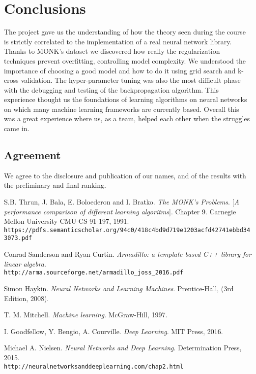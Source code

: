 \section{Conclusions}
The project gave us the understanding of how the theory seen during the course is strictly correlated to the implementation of a real neural network library. Thanks to MONK's dataset we discovered how really the regularization techniques prevent overfitting, controlling model complexity. We understood the importance of choosing a good model and how to do it using grid search and k-cross validation. The hyper-parameter tuning was also the most difficult phase with the debugging and testing of the backpropagation algorithm. This experience thought us the foundations of learning algorithms on neural networks on which many machine learning frameworks are currently based. Overall this was a great experience where us, as a team, helped each other when the struggles came in.
\subsection{Agreement}
We agree to the disclosure and publication of our names, and of the results with the
preliminary and final ranking.


\begin{thebibliography}{9}
	S.B. Thrun, J. Bala, E. Boloederon and I. Bratko.
	\textit{The MONK's Problems}. 
	[\textit{A performance comparison of different learning algoritms}]. Chapter 9.
	Carnegie Mellon University CMU-CS-91-197, 1991.
	\\\texttt{https://pdfs.semanticscholar.org/94c0/418c4bd9d719e1203acfd42741ebbd343073.pdf}
	
	Conrad Sanderson and Ryan Curtin. 
	\textit{Armadillo: a template-based C++ library for linear algebra}. 
	\\\texttt{http://arma.sourceforge.net/armadillo\_joss\_2016.pdf}

	
	Simon Haykin. 
	\textit{Neural Networks and Learning Machines}. 
	Prentice-Hall, (3rd Edition, 2008).


	T. M. Mitchell. 
	\textit{Machine learning}. 
	McGraw-Hill, 1997.
	
	I. Goodfellow, Y. Bengio, A. Courville. 
	\textit{Deep Learning}. 
	MIT Press,  2016.
	
	Michael A. Nielsen. 
	\textit{Neural Networks and Deep Learning}. 
	Determination Press, 2015.
	\\\texttt{http://neuralnetworksanddeeplearning.com/chap2.html}
\end{thebibliography}



